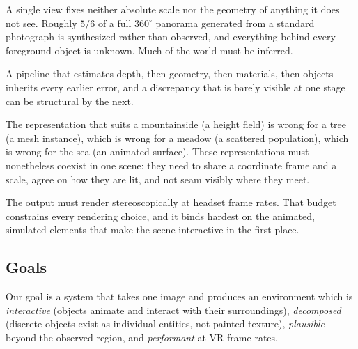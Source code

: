 \begin{description}[leftmargin=1.2em,style=nextline]
  \item[Extreme ill-posedness.] A single view fixes neither absolute scale nor
  the geometry of anything it does not see. Roughly $5/6$ of a full
  $360^\circ$ panorama generated from a standard photograph is synthesized rather
  than observed, and everything behind every foreground object is unknown. Much
  of the world must be inferred.

  \item[Compounding error.] A pipeline that estimates depth, then geometry, then
  materials, then objects inherits every earlier error, and a discrepancy that is
  barely visible at one stage can be structural by the next.

  \item[Heterogeneous content.] The representation that suits a mountainside
  (a height field) is wrong for a tree (a mesh instance), which is wrong for a
  meadow (a scattered population), which is wrong for the sea (an animated
  surface). These representations must nonetheless coexist in one scene: they
  need to share a coordinate frame and a scale, agree on how they are lit, and
  not seam visibly where they meet.

  \item[Interactivity constraints.] The output must render stereoscopically at
  headset frame rates. That budget constrains every rendering choice, and it
  binds hardest on the animated, simulated elements that make the scene
  interactive in the first place.

\end{description}

\subsection{Goals}

Our goal is a system that takes one image and produces an environment which is
\emph{interactive} (objects animate and interact with their surroundings),
\emph{decomposed} (discrete objects exist as individual entities, not painted
texture), \emph{plausible} beyond the observed region, and \emph{performant} at
VR frame rates.
